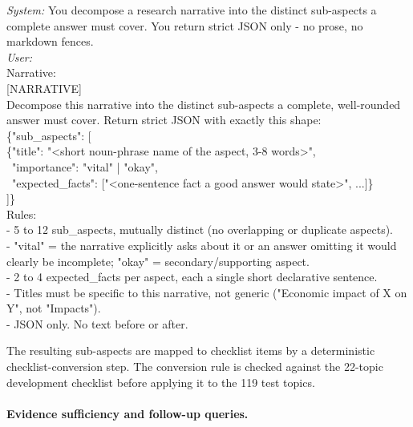 \begingroup
\footnotesize\ttfamily\raggedright
\textit{System:} You decompose a research narrative into the distinct
sub-aspects a complete answer must cover. You return strict JSON only -
no prose, no markdown fences.\\[4pt]
\textit{User:}\\
Narrative:\\
\mbox{[NARRATIVE]}\\[2pt]
Decompose this narrative into the distinct sub-aspects a complete,
well-rounded answer must cover. Return strict JSON with exactly this
shape:\\
\{"sub\_aspects": [\\
\phantom{\{}\{"title": "<short noun-phrase name of the aspect, 3-8 words>",\\
\phantom{\{}\ "importance": "vital" | "okay",\\
\phantom{\{}\ "expected\_facts": ["<one-sentence fact a good answer would state>", ...]\}\\
]\}\\[2pt]
Rules:\\
- 5 to 12 sub\_aspects, mutually distinct (no overlapping or duplicate
aspects).\\
- "vital" = the narrative explicitly asks about it or an answer
omitting it would clearly be incomplete; "okay" = secondary/supporting
aspect.\\
- 2 to 4 expected\_facts per aspect, each a single short declarative
sentence.\\
- Titles must be specific to this narrative, not generic ("Economic impact
of X on Y", not "Impacts").\\
- JSON only. No text before or after.
\par\endgroup

The resulting sub-aspects are mapped to checklist items by a
deterministic checklist-conversion step. The conversion rule is checked
against the 22-topic development checklist before applying it to the
119 test topics.

\paragraph{Evidence sufficiency and follow-up queries.}


